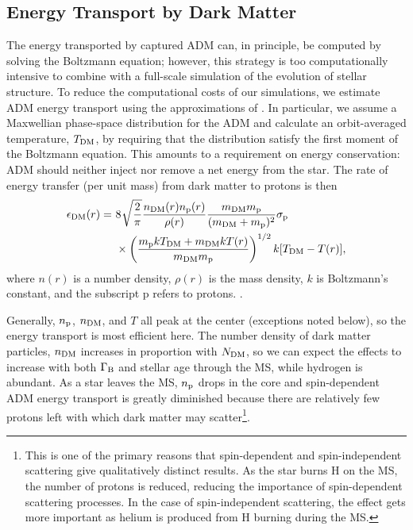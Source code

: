 \documentclass[useAMS,usenatbib]{mnras}
\begin{document}
\subsection{Energy Transport by Dark Matter}
\label{sub:energytransport}

  The energy transported by captured ADM can, in principle, be computed by solving the Boltzmann equation; however, this strategy is too computationally intensive to combine with a full-scale simulation of the evolution of stellar structure. To reduce the computational costs of our simulations, we estimate ADM energy transport using the approximations of \citet{Spergel1985EffectInterior}. In particular, we assume a Maxwellian phase-space distribution for the ADM and calculate an orbit-averaged temperature, $T_{\mathrm{DM}}$, by requiring that the distribution satisfy the first moment of the Boltzmann equation. This amounts to a requirement on energy conservation: ADM should neither inject nor remove a net energy from the star. The rate of energy transfer (per unit mass) from dark matter to protons is then
  \begin{align}
  \begin{split}
  \epsilon_{\mathrm{DM}}(r) =\ & 8\ \sqrt[]{\frac{2}{\pi}} \frac{n_{\mathrm{DM}}(r) n_{\mathrm{p}}(r)}{\rho(r)} \frac{m_{\mathrm{DM}} m_{\mathrm{p}}}{(m_{\mathrm{DM}}+m_{\mathrm{p}})^2} \sigma_{\mathrm{p}}\\
  & \times \left(\frac{m_{\mathrm{p}} k T_{\mathrm{DM}} + m_{\mathrm{DM}} k T(r)}{m_{\mathrm{DM}} m_{\mathrm{p}}}\right)^{1/2} k [T_{\mathrm{DM}} - T(r)],
  \label{eq:xheat}
  \end{split}
  \end{align}
  where $n(r)$ is a number density, $\rho(r)$ is the mass density, $k$ is Boltzmann's constant, and the subscript p refers to protons. \citep[See][for a detailed derivation]{Spergel1985EffectInterior}.

  Generally, $n_{\mathrm{p}}$, $n_{\mathrm{DM}}$, and $T$ all peak at the center (exceptions noted below), so the energy transport is most efficient here. The number density 
  of dark matter particles, $n_{\mathrm{DM}}$ increases in proportion with $N_{\mathrm{DM}}$, so we can expect the effects to increase with both $\Gamma_\mathrm{B}$ and stellar age through the MS, while hydrogen is abundant. As a star leaves the MS, $n_{\mathrm{p}}$ drops in the core and spin-dependent ADM energy transport is greatly diminished because there are relatively few protons left with which dark matter may scatter\footnote{This is one of the primary reasons that spin-dependent and spin-independent scattering give qualitatively distinct results. As the star burns H on the MS, the number of protons is reduced, reducing the importance of spin-dependent scattering processes. In the case of spin-independent scattering, the effect gets more important as helium 
  is produced from H burning during the MS.}. 
\end{document}
